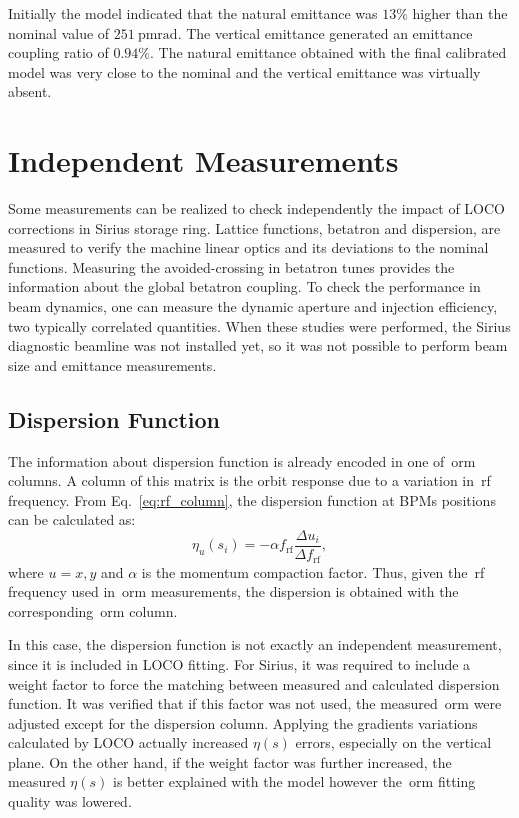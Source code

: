 Initially the model indicated that the natural emittance was $13\%$ higher than the nominal value of $\SI{251}{\pico\meter\radian}$. The vertical emittance generated an emittance coupling ratio of $0.94\%$. The natural emittance obtained with the final calibrated model was very close to the nominal and the vertical emittance was virtually absent.

\section{Independent Measurements}\label{sec:independent_meas}
Some measurements can be realized to check independently the impact of LOCO corrections in Sirius storage ring. Lattice functions, betatron and dispersion, are measured to verify the machine linear optics and its deviations to the nominal functions. Measuring the avoided-crossing in betatron tunes provides the information about the global betatron coupling. To check the performance in beam dynamics, one can measure the dynamic aperture and injection efficiency, two typically correlated quantities. When these studies were performed, the Sirius diagnostic beamline was not installed yet, so it was not possible to perform beam size and emittance measurements.

\subsection{Dispersion Function}
The information about dispersion function is already encoded in one of~\gls{orm} columns. A column of this matrix is the orbit response due to a variation in~\gls{rf} frequency. From Eq.~\eqref{eq:rf_column}, the dispersion function at BPMs positions can be calculated as:
\begin{equation}
\eta_u(s_i) = -\alpha f_{\mathrm{rf}}\dfrac{\Delta u_i}{ \Delta f_{\mathrm{rf}}},
\end{equation}
where $u=x, y$ and $\alpha$ is the momentum compaction factor. Thus, given the~\gls{rf} frequency used in~\gls{orm} measurements, the dispersion is obtained with the corresponding~\gls{orm} column.

In this case, the dispersion function is not exactly an independent measurement, since it is included in LOCO fitting. For Sirius, it was required to include a weight factor to force the matching between measured and calculated dispersion function. It was verified that if this factor was not used, the measured~\gls{orm} were adjusted except for the dispersion column. Applying the gradients variations calculated by LOCO actually increased $\eta(s)$ errors, especially on the vertical plane. On the other hand, if the weight factor was further increased, the measured $\eta(s)$ is better explained with the model however the~\gls{orm} fitting quality was lowered.

